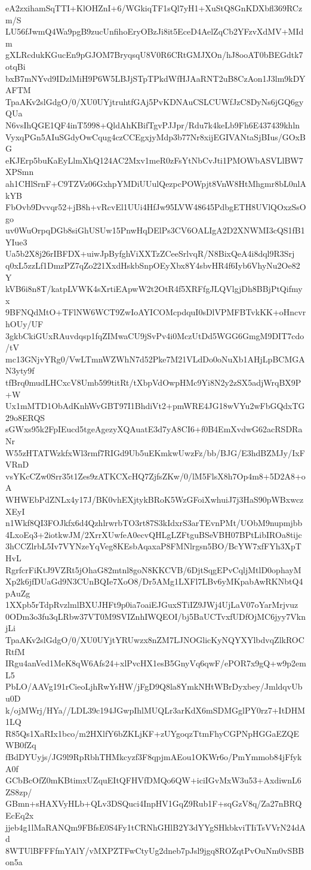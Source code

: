 eA2zxihamSqTTI+KlOHZnI+6/WGkiqTF1sQl7yH1+XuStQ8GnKDXbfl369RCzm/S
LU56fJwmQ4Wa9pgB9zucUnfihoEryOBzJi8it5EceD4AelZqCb2YFzvXdMV+MIdm
gXLRcdukKGucEn9pGJOM7BryqsqU8V0R6CRtGMJXOn/hJ8ooAT0bBEGdtk7otqBi
bxB7mNYvd9IDzlMiH9P6W5LBJjSTpTPkdWfHJAaRNT2uB8CzAon1J3lm9kDYAFTM
TpaAKv2slGdgO/0/XU0UYjtruhtfGAj5PvKDNAuCSLCUWfJzC8DyNs6jGQ6gyQUa
N6vsIhQGE1QF4inT5998+QldAhKBifTgvPJJpr/Rdu7k4keLb9Fh6E437439khln
VyxqPGn5AIuSGdyOwCqug4czCCEgxjyMdp3b77Nr8xijEGIVANtaSjBIus/GOxBG
eKJErp5buKaEyLlmXhQ124AC2Mxv1meR0zFsYtNbCvJti1PMOWbASVLlBW7XPSmn
ah1CHlSrnF+C9TZVz06GxhpYMDiUUulQezpcPOWpjt8VnW8HtMhgmr8bL0nlAkYB
FbOvb9Dvvqr52+jB8h+vRcvEl1UUi4HfJw95LVW48645PdbgETH8UVlQOxzSsOgo
uv0WuOrpqDGb8siGhUSUw15PnwHqDElPs3CV6OALIgA2D2XNWMI3cQS1fB1YIue3
Ua5b2X8j26rIBFDX+uiwJpByfghViXXTzZCeeSrlvqR/N8BixQeA4i8dql9R3Srj
q0xL5zzLf1DmzPZ7qZo221XxdHskbSnpOEyXbx8Y4sbvHR4f6Iyb6VhyNu2Oe82Y
kVB6i8n8T/katpLVWK4sXrtiEApwW2t2OtR4f5XRFfgJLQVlgjDh8BBjPtQifmyx
9BFNQdMtO+TFlNW6WCT9ZwIoAYICOMcpdquI0sDlVPMFBTvkKK+oHncvrhOUy/UF
3gkbCkiGUxRAuvdqsp1fqZIMwaCU9jSvPv4i0MczUtDd5WGG6GmgM9DIT7cdo/tV
mc13GNjvYRg0/VwLTmnWZWhN7d52Pke7M21VLdDo0oNuXb1AHjLpBCMGAN3yty9f
tfBrq0mudLHCxcV8Umb599titRt/tXbpVdOwpHMc9Yi8N2y2zSX5adjWrqBX9P+W
Ux1mMTD1ObAdKnhWvGBT97I1BhdiVt2+pmWRE4JG18wVYu2wFbGQdxTG29o8ERQS
sGWxs95k2FpIEucd5tgeAgezyXQAuatE3d7yA8CI6+f0B4EmXvdwG62acRSDRaNr
W55zHTATWzkfxWl3rmf7RIGd9Ub5uEKmkwUwzFz/bb/BJG/E3hdBZMJy/IxFVRnD
vsYKcCZw0Srr35t1Zes9zATKCXcHQ7ZjfsZKw/0/lM5FlsX8h7Op4m8+5D2A8+oA
WHWEbPdZNLx4y17J/BK0vhEXjtykBRoK5WzGFoiXwhuiJ7j3HaS90pWBxwczXEyI
n1Wkf8QI3FOJkfx6d4QzhlrwrbTO3rt87S3kIdxrS3arTEvnPMt/UObM9nupmjbb
4LxoEq3+2iotkwJM/2XrrXUwfeA0ecvQHLgLZFtguBSeVBH07BPtLibIROa8tijc
3hCCZlrbL5Iv7VYNzeYqVeg8KEsbAqaxaP8FMNlrgsn5BO/BcYW7xfFYh3XpTHvL
RgrfcrFiKtJ9VZRt5jOhaG82mtnl8goN8KKCVB/6DjtSqgEPvCqljMtlD0ophayM
Xp2k6jfDUaGd9N3CUnBQIe7XoO8/Dr5AMg1LXFl7LBv6yMKpabAwRKNbtQ4pAuZg
1XXpb5rTdpRvzlmlBXUJHFt9p0ia7oaiEJGuxSTiIZ9JWj4UjLaV07oYarMrjvuz
0ODm3o3fu3qLRbw37VT0M9SVIZnhIWQEOI/bj5BaUCTvxfUDfOjMC6jyy7VknjLi
TpaAKv2slGdgO/0/XU0UYjtYRUwzx8nZM7LJNOGlicKyNQYXYlbdvqZlkROCRtfM
IRgu4anVed1MeK8qW6Afs24+xlPvcHX1esB5GnyVq6qwF/ePOR7x9gQ+w9p2emL5
PbLO/AAVg191rCieoLjhRwYsHW/jFgD9Q8la8YmkNHtWBrDyxbey/JmldqvUbu0D
k/ojMWrj/HYa//LDL39c194JGwpIhlMUQLr3arKdX6mSDMGglPY0rz7+ItDHM1LQ
R85Qs1XaRIx1bco/m2HXlfY6bZKLjKF+zUYgoqzTtmFhyCGPNpHGGaEZQEWB0fZq
fBdDYUyjs/JG9l9RpRbhTHMkcyzf3F8qpjmAEou1OKWr6o/PmYmmob84jFfykA0f
GCbBcOfZ0mKBtimxUZquEItQFHVfDMQo6QW+iciIGvMxW3u53+AxdiwnL6ZS8zp/
GBmn+sHAXVyHLb+QLv3DSQuci4InpHV1GqZ9Rub1F+sqGzV8q/Za27nBRQEcEq2x
jjeb4g1lMaRANQm9FBfsE0S4Fy1tCRNhGHlB2Y3dYYgSHkbkviTIiTsVVrN24dAd
8WTUlBFFFfmYAlY/vMXPZTFwCtyUg2dneb7pJsl9jgq8ROZqtPvOuNm0vSBBon5a
